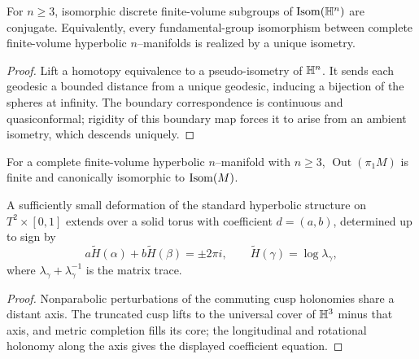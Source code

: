 \begin{theorem}
\label{thurston-ch05-mostow-rigidity}
For $n\ge3$, isomorphic discrete finite-volume subgroups of $\operatorname{Isom}(\mathbb{H}^n)$ are conjugate.  Equivalently, every fundamental-group isomorphism between complete finite-volume hyperbolic $n$--manifolds is realized by a unique isometry.
\end{theorem}
\begin{proof}\sketch Lift a homotopy equivalence to a pseudo-isometry of $\mathbb{H}^n$.  It sends each geodesic a bounded distance from a unique geodesic, inducing a bijection of the spheres at infinity.  The boundary correspondence is continuous and quasiconformal; rigidity of this boundary map forces it to arise from an ambient isometry, which descends uniquely.\end{proof}

\begin{corollary}
\label{thurston-ch05-finite-outer-automorphisms}
For a complete finite-volume hyperbolic $n$--manifold with $n\ge3$, $\operatorname{Out}(\pi_1M)$ is finite and canonically isomorphic to $\operatorname{Isom}(M)$.
\end{corollary}

\begin{lemma}
\label{thurston-ch05-dehn-filling-local}
A sufficiently small deformation of the standard hyperbolic structure on $T^2\times[0,1]$ extends over a solid torus with coefficient $d=(a,b)$, determined up to sign by
\[
a\widetilde H(\alpha)+b\widetilde H(\beta)=\pm2\pi i,
\qquad \widetilde H(\gamma)=\log\lambda_\gamma,
\]
where $\lambda_\gamma+\lambda_\gamma^{-1}$ is the matrix trace.
\end{lemma}
\begin{proof}\sketch Nonparabolic perturbations of the commuting cusp holonomies share a distant axis.  The truncated cusp lifts to the universal cover of $\mathbb{H}^3$ minus that axis, and metric completion fills its core; the longitudinal and rotational holonomy along the axis gives the displayed coefficient equation.\end{proof}

